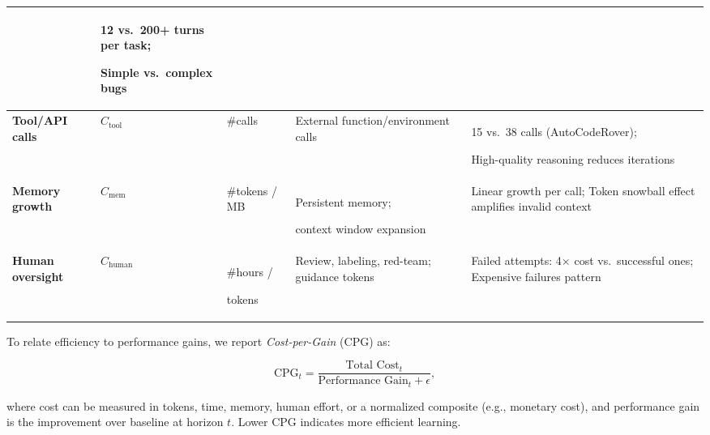 \begin{table}[t!]
{\begin{tabular}{m{2.5cm}m{1.4cm}m{2cm}m{4.8cm}m{6.8cm}}
& 12 vs.\ 200+ turns per task; 

Simple vs.\ complex bugs\\

\midrule

\cellcolor[rgb]{0.96,0.96,0.96}\textbf{Tool/API calls} 

& \cellcolor[rgb]{0.96,0.96,0.96}$C_{\text{tool}}$ 

& \cellcolor[rgb]{0.96,0.96,0.96}\#calls 

& \cellcolor[rgb]{0.96,0.96,0.96}External function/environment calls 

& \cellcolor[rgb]{0.96,0.96,0.96}15 vs.\ 38 calls (AutoCodeRover); 

High-quality reasoning reduces iterations \\

\midrule

\textbf{Memory growth} 

& $C_{\text{mem}}$ 

& \#tokens / MB 

& Persistent memory;

context window expansion 

& Linear growth per call; Token snowball effect amplifies invalid context \\

\midrule

\cellcolor[rgb]{0.96,0.96,0.96}\textbf{Human oversight} 

& \cellcolor[rgb]{0.96,0.96,0.96}$C_{\text{human}}$ 

& \cellcolor[rgb]{0.96,0.96,0.96} \#hours / 

tokens 

& \cellcolor[rgb]{0.96,0.96,0.96}Review, labeling, red-team; guidance tokens 

& \cellcolor[rgb]{0.96,0.96,0.96}Failed attempts: 4× cost vs.\ successful ones; Expensive failures pattern \\

\bottomrule

\end{tabular}}

\end{table}

To relate efficiency to performance gains, we report \emph{Cost-per-Gain} (CPG) as:

\[
\mathrm{CPG}_t = \frac{\text{Total Cost}_t}{\text{Performance Gain}_t + \epsilon},
\]

where cost can be measured in tokens, time, memory, human effort, or a normalized composite (e.g., monetary cost), and performance gain is the improvement over baseline at horizon $t$. Lower CPG indicates more efficient learning.



